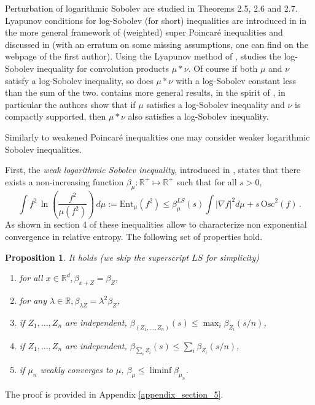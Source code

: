 \documentclass[11pt,reqno]{amsart}
\numberwithin{equation}{section}
\newtheorem{proposition}[theorem]{Proposition}
\theoremstyle{definition}
\theoremstyle{remark}
\def \Ent {\textrm{Ent}}
\def \Osc {\textrm{Osc}}
\begin{document}
Perturbation of logarithmic Sobolev are studied in \cite{CGPerturb} Theorems 2.5, 2.6 and 2.7. Lyapunov conditions for log-Sobolev (for short) inequalities are introduced in \cite{CGWu} in the more general framework of (weighted) super Poincar\'e inequalities and discussed in \cite{CGhit} (with an erratum on some missing assumptions, one can find on the webpage of the first author). Using the Lyapunov method of \cite{CGWu}, \cite{WW} studies the log-Sobolev inequality for convolution products $\mu*\nu$. Of course if both $\mu$ and $\nu$ satisfy a log-Sobolev inequality, so does $\mu*\nu$ with a log-Sobolev constant less than the sum of the two. \cite{WW} contains more general results, in the spirit of \cite{weakconvol}, in particular the authors show that if $\mu$ satisfies a log-Sobolev inequality and $\nu$ is compactly supported, then $\mu*\nu$ also satisfies a log-Sobolev inequality.


Similarly to weakened Poincar\'e inequalities one may consider weaker logarithmic Sobolev inequalities.


First, the \emph{weak logarithmic Sobolev inequality}, introduced in \cite{CGG}, states that there exists a non-increasing function $\beta_\mu:\mathbb{R}^+\mapsto\mathbb{R}^+$ such that for all $s>0$,
\begin{equation}\label{eqweakLS}
    \int f^2 \, \ln\left(\frac{f^2}{\mu(f^2)}\right) \, d\mu := \Ent_{\mu}(f^2)\leq \beta^{LS}_\mu(s) \int |\nabla f|^2 d\mu + s \, \Osc^2(f) \, .
\end{equation}
As shown in section 4 of \cite{CGG} these inequalities allow to characterize non exponential convergence in relative entropy. The following set of properties hold.
\begin{proposition}\label{propertieswLSI}
    It holds (we skip the superscript $LS$ for simplicity)
    \begin{enumerate}
        \item[(1)] for all $x\in\mathbb{R}^d, \beta_{x+Z} = \beta_Z$,
        \item[(2)] for any $\lambda\in\mathbb{R}, \beta_{\lambda Z} = \lambda^2\beta_Z$,
        \item[(3)] if $Z_1, \dots, Z_n$ are independent, $\beta_{(Z_1, \dots, Z_n)}(s)\leq \max_i\beta_{Z_i}(s/n)$,
        \item[(4)] if $Z_1, \dots, Z_n$ are independent, $\beta_{\sum_i Z_i}(s)\leq \sum_i\beta_{Z_i}(s/n)$,
        \item[(5)] if $\mu_n$ weakly converges to $\mu$, $\beta_{\mu} \leq\liminf\beta_{\mu_n}$.
    \end{enumerate}
\end{proposition}
The proof is provided in Appendix \ref{appendix_section_5}.
\end{document}
